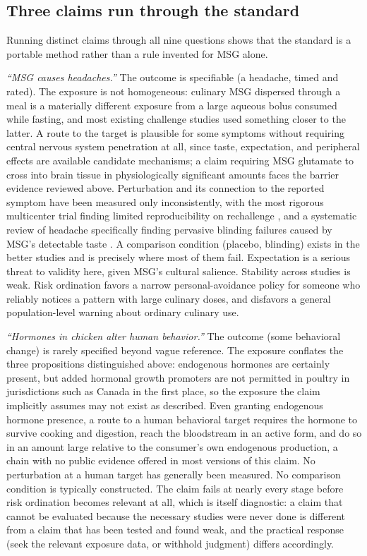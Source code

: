 \documentclass[11pt]{article}
\begin{document}
\subsection{Three claims run through the standard}

Running distinct claims through all nine questions shows that the standard is a portable method rather than a rule invented for MSG alone.

\emph{``MSG causes headaches.''} The outcome is specifiable (a headache, timed and rated). The exposure is not homogeneous: culinary MSG dispersed through a meal is a materially different exposure from a large aqueous bolus consumed while fasting, and most existing challenge studies used something closer to the latter. A route to the target is plausible for some symptoms without requiring central nervous system penetration at all, since taste, expectation, and peripheral effects are available candidate mechanisms; a claim requiring MSG glutamate to cross into brain tissue in physiologically significant amounts faces the barrier evidence reviewed above. Perturbation and its connection to the reported symptom have been measured only inconsistently, with the most rigorous multicenter trial finding limited reproducibility on rechallenge \citep{geha2000multicenter}, and a systematic review of headache specifically finding pervasive blinding failures caused by MSG's detectable taste \citep{obayashi2016headache}. A comparison condition (placebo, blinding) exists in the better studies and is precisely where most of them fail. Expectation is a serious threat to validity here, given MSG's cultural salience. Stability across studies is weak. Risk ordination favors a narrow personal-avoidance policy for someone who reliably notices a pattern with large culinary doses, and disfavors a general population-level warning about ordinary culinary use.

\emph{``Hormones in chicken alter human behavior.''} The outcome (some behavioral change) is rarely specified beyond vague reference. The exposure conflates the three propositions distinguished above: endogenous hormones are certainly present, but added hormonal growth promoters are not permitted in poultry in jurisdictions such as Canada in the first place, so the exposure the claim implicitly assumes may not exist as described. Even granting endogenous hormone presence, a route to a human behavioral target requires the hormone to survive cooking and digestion, reach the bloodstream in an active form, and do so in an amount large relative to the consumer's own endogenous production, a chain with no public evidence offered in most versions of this claim. No perturbation at a human target has generally been measured. No comparison condition is typically constructed. The claim fails at nearly every stage before risk ordination becomes relevant at all, which is itself diagnostic: a claim that cannot be evaluated because the necessary studies were never done is different from a claim that has been tested and found weak, and the practical response (seek the relevant exposure data, or withhold judgment) differs accordingly.
\end{document}
